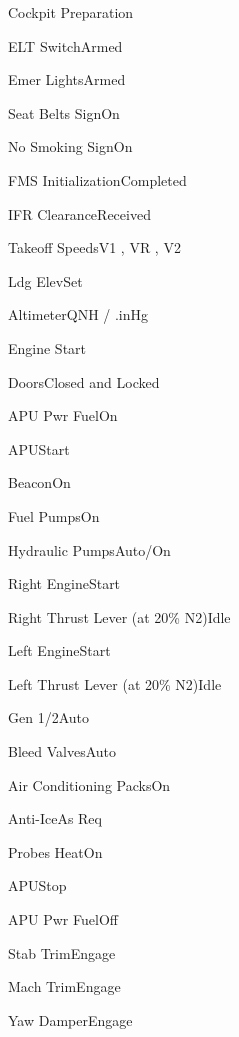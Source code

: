 \documentclass[sim-use]{checklist}
\begin{document}
\begin{checklist}{Cockpit Preparation}
{    }
    \item{ELT Switch}{Armed}
    \item{Emer Lights}{Armed}
    \item{Seat Belts Sign}{On}
    \item{No Smoking Sign}{On}
    \item{FMS Initialization}{Completed}
    \item{IFR Clearance}{Received}
    \item{Takeoff Speeds}{V1 \blank, VR \blank, V2 \blank}
    \item{Ldg Elev}{Set}
    \item{Altimeter}{\blank QNH / \blank.\blank inHg}
\end{checklist}

\begin{checklist}{Engine Start}
    \item{Doors}{Closed and Locked}
    \item{APU Pwr Fuel}{On}
    \item{APU}{Start}
    \item{Beacon}{On}
    \item{Fuel Pumps}{On}
    \item{Hydraulic Pumps}{Auto/On}
    \item{Right Engine}{Start}
    \item{Right Thrust Lever (at 20\% N2)}{Idle}
    \item{Left Engine}{Start}
    \item{Left Thrust Lever (at 20\% N2)}{Idle}
    \item{Gen 1/2}{Auto}
    \item{Bleed Valves}{Auto}
    \item{Air Conditioning Packs}{On}
    \item{Anti-Ice}{As Req}
    \item{Probes Heat}{On}
    \item{APU}{Stop}
    \item{APU Pwr Fuel}{Off}
    \item{Stab Trim}{Engage}
    \item{Mach Trim}{Engage}
    \item{Yaw Damper}{Engage}
\end{checklist}
\end{document}
